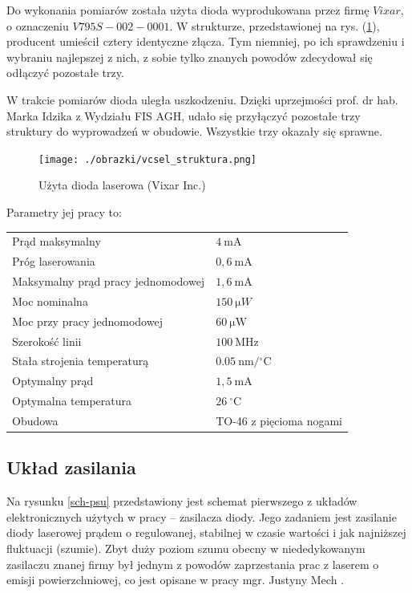 \documentclass[a4paper,10pt,twoside]{article}
\begin{document}
Do wykonania pomiarów została użyta dioda wyprodukowana przez firmę $Vixar$, o oznaczeniu $V795S-002-0001$.
W strukturze, przedstawionej na rys. (\ref{struktura}), producent umieścił cztery identyczne złącza. Tym niemniej, po ich sprawdzeniu i wybraniu najlepszej z nich, z sobie tylko znanych powodów zdecydował się odłączyć pozostałe trzy.

W trakcie pomiarów dioda uległa uszkodzeniu. Dzięki uprzejmości prof. dr hab. Marka Idzika z Wydziału FIS AGH, udało się przyłączyć pozostałe trzy struktury do wyprowadzeń w obudowie.
Wszystkie trzy okazały się sprawne.

\begin{figure}[h!]
\begin{center}
 \texttt{[image: ./obrazki/vcsel\_struktura.png]}
\end{center}
\caption{Użyta dioda laserowa (Vixar Inc.)}
\label{struktura}
\end{figure}


Parametry jej pracy to:
\begin{center}
\begin{tabular}{ll}
Prąd maksymalny & $4 ~\mathrm{mA}$\\
Próg laserowania & $0{,}6~\mathrm{mA}$\\
Maksymalny prąd pracy jednomodowej & $1{,}6~\mathrm{mA}$\\
Moc nominalna & $150~\mathrm{\mu }W$\\
Moc przy pracy jednomodowej & $60~\mathrm{\mu W}$\\
Szerokość linii & $100~\mathrm{MHz}$\\
Stała strojenia temperaturą & $0.05 ~\mathrm{nm/{}^{\circ}C}$\\
Optymalny prąd & $1{,}5 ~\mathrm{mA}$\\
Optymalna temperatura & $26~\mathrm{ {}^{\circ}C}$ \\
Obudowa & TO-46 z pięcioma nogami
\end{tabular}
\end{center}


\subsection{Układ zasilania}

Na rysunku \ref{sch-psu} przedstawiony jest schemat pierwszego z układów elektronicznych użytych w pracy -- zasilacza diody. Jego zadaniem jest zasilanie diody laserowej prądem o regulowanej, stabilnej w czasie wartości i jak najniższej fluktuacji (szumie). Zbyt duży poziom szumu obecny w niededykowanym zasilaczu znanej firmy był jednym z powodów zaprzestania prac z laserem o emisji powierzchniowej, co jest opisane w pracy mgr. Justyny Mech \cite{mgrJustynaMech}.
\end{document}
